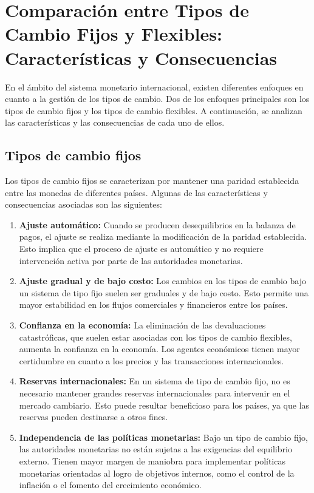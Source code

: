 \documentclass[
  jou,
  floatsintext,
  longtable,
  a4paper,
  nolmodern,
  notxfonts,
  notimes,
  12pt,
  colorlinks=true,linkcolor=blue,citecolor=blue,urlcolor=blue]{apa7}
\begin{document}
\section{Comparación entre Tipos de Cambio Fijos y Flexibles:
Características y
Consecuencias}\label{comparaciuxf3n-entre-tipos-de-cambio-fijos-y-flexibles-caracteruxedsticas-y-consecuencias}

En el ámbito del sistema monetario internacional, existen diferentes
enfoques en cuanto a la gestión de los tipos de cambio. Dos de los
enfoques principales son los tipos de cambio fijos y los tipos de cambio
flexibles. A continuación, se analizan las características y las
consecuencias de cada uno de ellos.

\subsection{Tipos de cambio fijos}\label{tipos-de-cambio-fijos}

Los tipos de cambio fijos se caracterizan por mantener una paridad
establecida entre las monedas de diferentes países. Algunas de las
características y consecuencias asociadas son las siguientes:

\begin{enumerate}
\def\labelenumi{\arabic{enumi}.}
\item
  \textbf{Ajuste automático:} Cuando se producen desequilibrios en la
  balanza de pagos, el ajuste se realiza mediante la modificación de la
  paridad establecida. Esto implica que el proceso de ajuste es
  automático y no requiere intervención activa por parte de las
  autoridades monetarias.
\item
  \textbf{Ajuste gradual y de bajo costo:} Los cambios en los tipos de
  cambio bajo un sistema de tipo fijo suelen ser graduales y de bajo
  costo. Esto permite una mayor estabilidad en los flujos comerciales y
  financieros entre los países.
\item
  \textbf{Confianza en la economía:} La eliminación de las devaluaciones
  catastróficas, que suelen estar asociadas con los tipos de cambio
  flexibles, aumenta la confianza en la economía. Los agentes económicos
  tienen mayor certidumbre en cuanto a los precios y las transacciones
  internacionales.
\item
  \textbf{Reservas internacionales:} En un sistema de tipo de cambio
  fijo, no es necesario mantener grandes reservas internacionales para
  intervenir en el mercado cambiario. Esto puede resultar beneficioso
  para los países, ya que las reservas pueden destinarse a otros fines.
\item
  \textbf{Independencia de las políticas monetarias:} Bajo un tipo de
  cambio fijo, las autoridades monetarias no están sujetas a las
  exigencias del equilibrio externo. Tienen mayor margen de maniobra
  para implementar políticas monetarias orientadas al logro de objetivos
  internos, como el control de la inflación o el fomento del crecimiento
  económico.
\end{enumerate}
\end{document}
